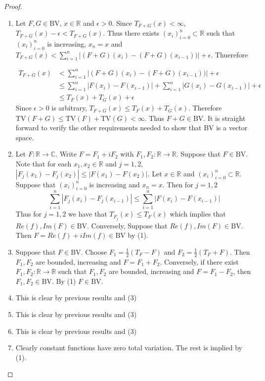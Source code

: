 \documentclass{book}
\theoremstyle{definition}
\newcommand{\ep}{\epsilon}
\newcommand{\C}{\mathbb{C}}
\newcommand{\R}{\mathbb{R}}
\DeclareMathOperator*{\0}{\mbf{0}}
\DeclareMathOperator*{\1}{\mbf{1}}
\newcommand{\BV}{\text{BV}}
\newcommand{\TV}{\text{TV}}
\begin{document}
	\begin{proof}
		\begin{enumerate}
			\item Let $F, G \in \BV$, $x \in \R$ and $\ep>0$. Since $T_{F+G}(x) < \infty$, $T_{F+G}(x)-\ep< T_{F+G}(x)$. Thus there exists $(x_i)_{i=0}^n \subset \R$ such that $(x_i)_{i=0}^n$ is increasing, $x_n=x$ and $T_{F+G}(x) < \sum_{i=1}^n |(F+G)(x_i) - (F+G)(x_{i-1}))|+ \ep$. Thuerefore 
			
			\begin{align*}
				T_{F+G}(x)
				& < \sum_{i=1}^n |(F+G)(x_i) - (F+G)(x_{i-1}))|+ \ep\\
				& \leq \sum_{i=1}^n |F(x_i)-F(x_{i-1})|+ \sum_{i=1}^n|G(x_i)-G(x_{i-1})| + \ep\\
				& \leq T_F(x) + T_G(x) + \ep
			\end{align*}
			Since $\ep >0$ is arbitrary, $T_{F+G}(x) \leq T_F(x)+T_G(x)$. Therefore $\TV(F+G) \leq \TV(F)+\TV(G)<\infty$. Thus $F+G \in \BV$. It is straight forward to verify the other requirements needed to show that $\BV$ is a vector space.
			
			\item Let $F: \R \rightarrow \C$. Write $F=F_1+iF_2$ with $F_1, F_2:\R \rightarrow \R$. Suppose that $F \in \BV$. Note that for each $x_1,x_2 \in \R$ and $j =1,2$, $|F_j(x_1)-F_j(x_2)| \leq |F(x_1)-F(x_2)|$. Let $x\in \R$ and $(x_i)_{i=0}^n \subset \R$. Suppose that $(x_i)_{i=0}^n$ is increasing and $x_n=x$. Then for $j=1,2$ 
			$$\sum_{i=1}^n|F_j(x_i)-F_j(x_{i-1})| \leq \sum_{i=1}^n|F(x_i)-F(x_{i-1})|$$
			Thus for $j=1,2$ we have that $T_{F_j}(x) \leq T_F(x)$ which implies that $Re(f),Im(F) \in \BV$. Conversely, Suppose that $Re(f), Im(F) \in \BV$. Then $F=Re(f)+iIm(f) \in \BV$ by (1).
			\item Suppose that $F \in \BV$. Choose $F_1=\frac{1}{2}(T_F-F)$ and $F_2=\frac{1}{2}(T_F+F)$. Then $F_1,F_2$ are bounded, increasing and $F=F_1+F_2$. Conversely, if there exist $F_1,F_2:\R \rightarrow \R$ such that $F_1,F_2$ are bounded, increasing and $F=F_1-F_2$, then $F_1, F_2 \in \BV$. By (1) $F \in \BV$.
			\item This is clear by previous results and (3)
			\item This is clear by previous results and (3)
			\item This is clear by previous results and (3)
			\item Clearly constant functions have zero total variation. The rest is implied by (1).
		\end{enumerate}
	\end{proof}
	
\end{document}
